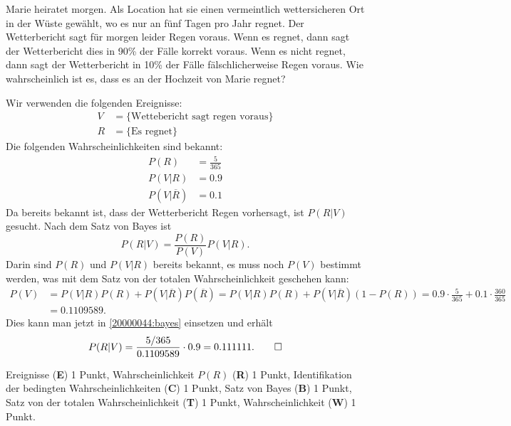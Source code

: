 Marie heiratet morgen.
Als Location hat sie einen vermeintlich wettersicheren Ort in 
der Wüste gewählt, wo es nur an fünf Tagen pro Jahr regnet.
Der Wetterbericht sagt für morgen leider Regen voraus.
Wenn es regnet, dann sagt der Wetterbericht dies in 90\% der Fälle
korrekt voraus.
Wenn es nicht regnet, dann sagt der Wetterbericht in 10\% der Fälle
fälschlicherweise Regen voraus.
Wie wahrscheinlich ist es, dass es an der Hochzeit von Marie regnet?


\begin{loesung}
Wir verwenden die folgenden Ereignisse:
\begin{align*}
V&=\{\text{Wettebericht sagt regen voraus}\}\\
R&=\{\text{Es regnet}\}
\end{align*}
Die folgenden Wahrscheinlichkeiten sind bekannt:
\begin{align*}
P(R)
&=
\frac{5}{365}
\\
P(V|R)
&=
0.9
\\
P(V|\overline{R})
&=
0.1
\end{align*}
Da bereits bekannt ist, dass der Wetterbericht Regen vorhersagt, ist
$P(R|V)$ gesucht.
Nach dem Satz von Bayes ist
\begin{equation}
P(R|V)
=
\frac{P(R)}{P(V)}P(V|R).
\label{20000044:bayes} 
\end{equation}
Darin sind $P(R)$ und $P(V|R)$ bereits bekannt, es muss noch $P(V)$ bestimmt
werden, was mit dem Satz von der totalen Wahrscheinlichkeit geschehen kann:
\begin{align*}
P(V)
&=
P(V|R)P(R)+P(V|\overline{R})P(\overline{R})
=
P(V|R)P(R)+P(V|\overline{R})(1-P(R))
=
0.9\cdot\frac{5}{365}+0.1\cdot\frac{360}{365}
\\
&=
0.1109589.
\end{align*}
Dies kann man jetzt in \eqref{20000044:bayes} einsetzen und erhält
\[
P(R|V)
=
\frac{5/365}{0.1109589}\cdot 0.9
=
0.111111.
\qedhere
\]
\end{loesung}

\begin{bewertung}
Ereignisse ({\bf E}) 1 Punkt,
Wahrscheinlichkeit $P(R)$ ({\bf R}) 1 Punkt,
Identifikation der bedingten Wahrscheinlichkeiten ({\bf C}) 1 Punkt,
Satz von Bayes ({\bf B}) 1 Punkt,
Satz von der totalen Wahrscheinlichkeit ({\bf T}) 1 Punkt,
Wahrscheinlichkeit ({\bf W}) 1 Punkt.
\end{bewertung}

